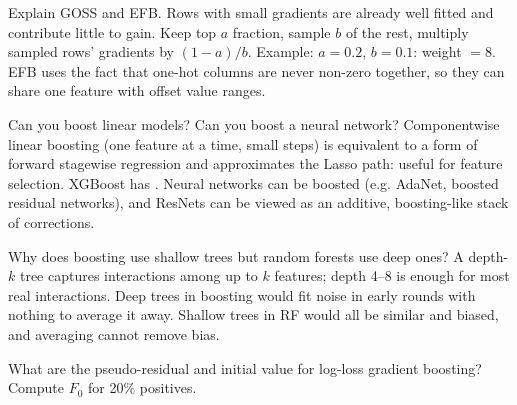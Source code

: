 \begin{qa}{Explain GOSS and EFB.}
\why Rows with small gradients are already well fitted and contribute little to gain. Keep top $a$ fraction, sample $b$ of the
rest, multiply sampled rows' gradients by $(1-a)/b$. Example: $a = 0.2$, $b = 0.1$: weight $= 8$. EFB uses the fact that one-hot
columns are never non-zero together, so they can share one feature with offset value ranges.
\end{qa}

\begin{qa}{\deep Can you boost linear models? Can you boost a neural network?}
\why Componentwise linear boosting (one feature at a time, small steps) is equivalent to a form of forward stagewise regression and
approximates the Lasso path: useful for feature selection. XGBoost has . Neural networks can be boosted
(e.g. AdaNet, boosted residual networks), and ResNets can be viewed as an additive, boosting-like stack of corrections.
\end{qa}

\begin{qa}{\deep Why does boosting use shallow trees but random forests use deep ones?}
\why A depth-$k$ tree captures interactions among up to $k$ features; depth 4--8 is enough for most real interactions. Deep trees in
boosting would fit noise in early rounds with nothing to average it away. Shallow trees in RF would all be similar and biased, and
averaging cannot remove bias.
\end{qa}

\begin{qa}{What are the pseudo-residual and initial value for log-loss gradient boosting? Compute $F_0$ for 20\% positives.}
\end{qa}

